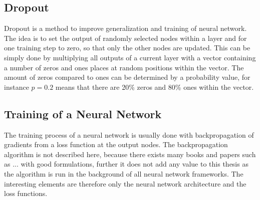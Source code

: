 
\subsection{Dropout}
Dropout is a method to improve generalization and training of neural network.
The idea is to set the output of randomly selected nodes within a layer and for one training step to zero, so that only the other nodes are updated.
This can be simply done by multiplying all outputs of a current layer with a vector containing a number of zeros and ones places at random positions within the vector.
The amount of zeros compared to ones can be determined by a probability value, for instance $p=0.2$ means that there are 20\% zeros and 80\% ones within the vector.



\subsection{Training of a Neural Network}
The training process of a neural network is usually done with backpropagation of gradients from a loss function at the output nodes.
The backpropagation algorithm is not described here, because there exists many books and papers such as ... with good formulations, further it does not add any value to this thesis as the algorithm is run in the background of all neural network frameworks.
The interesting elements are therefore only the neural network architecture and the loss functions.
